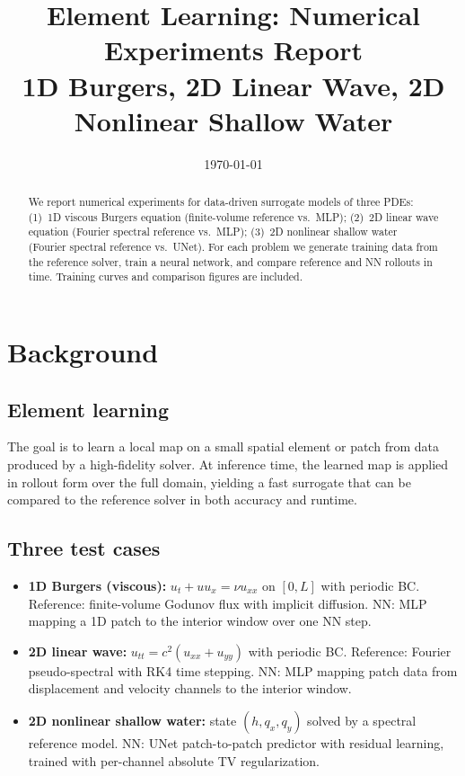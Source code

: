 ﻿\documentclass[11pt,a4paper]{article}
\title{Element Learning: Numerical Experiments Report\\
\large 1D Burgers, 2D Linear Wave, 2D Nonlinear Shallow Water}
\author{}
\date{\today}
\begin{document}
\maketitle

\begin{abstract}
We report numerical experiments for data-driven surrogate models of three PDEs: (1)~1D viscous Burgers equation (finite-volume reference vs.\ MLP); (2)~2D linear wave equation (Fourier spectral reference vs.\ MLP); (3)~2D nonlinear shallow water (Fourier spectral reference vs.\ UNet). For each problem we generate training data from the reference solver, train a neural network, and compare reference and NN rollouts in time. Training curves and comparison figures are included.
\end{abstract}

\section{Background}

\subsection{Element learning}
The goal is to learn a local map on a small spatial element or patch from data produced by a high-fidelity solver. At inference time, the learned map is applied in rollout form over the full domain, yielding a fast surrogate that can be compared to the reference solver in both accuracy and runtime.

\subsection{Three test cases}
\begin{itemize}
  \item \textbf{1D Burgers (viscous):} $u_t + u u_x = \nu u_{xx}$ on $[0,L]$ with periodic BC. Reference: finite-volume Godunov flux with implicit diffusion. NN: MLP mapping a 1D patch to the interior window over one NN step.
  \item \textbf{2D linear wave:} $u_{tt} = c^2(u_{xx}+u_{yy})$ with periodic BC. Reference: Fourier pseudo-spectral with RK4 time stepping. NN: MLP mapping patch data from displacement and velocity channels to the interior window.
  \item \textbf{2D nonlinear shallow water:} state $(h,q_x,q_y)$ solved by a spectral reference model. NN: UNet patch-to-patch predictor with residual learning, trained with per-channel absolute TV regularization.
\end{itemize}
\end{document}
